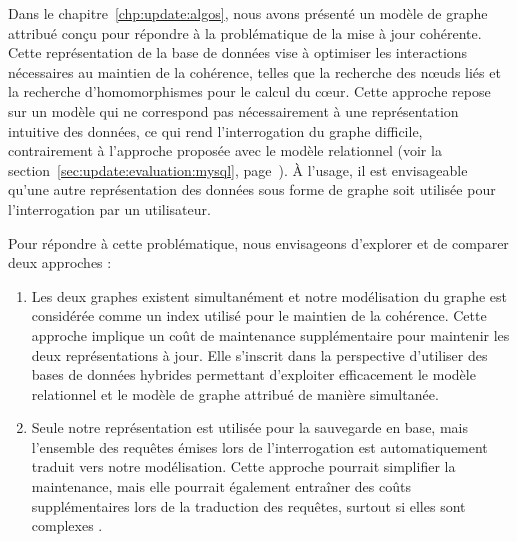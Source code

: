 Dans le chapitre~\ref{chp:update:algos}, nous avons présenté un modèle de graphe attribué conçu pour répondre à la problématique de la mise à jour cohérente.
Cette représentation de la base de données vise à optimiser les interactions nécessaires au maintien de la cohérence, telles que la recherche des nœuds liés et la recherche d'homomorphismes pour le calcul du cœur.
Cette approche repose sur un modèle qui ne correspond pas nécessairement à une représentation intuitive des données, ce qui rend l'interrogation du graphe difficile, contrairement à l'approche proposée avec le modèle relationnel (voir la section~\ref{sec:update:evaluation:mysql}, page~\pageref{sec:update:evaluation:mysql}).
À l'usage, il est envisageable qu'une autre représentation des données sous forme de graphe soit utilisée pour l'interrogation par un utilisateur.

Pour répondre à cette problématique, nous envisageons d'explorer et de comparer deux approches :
\begin{enumerate}
    \item Les deux graphes existent simultanément et notre modélisation du graphe est considérée comme un index utilisé pour le maintien de la cohérence.
    Cette approche implique un coût de maintenance supplémentaire pour maintenir les deux représentations à jour.
    Elle s'inscrit dans la perspective d'utiliser des bases de données hybrides \cite{hassanGRFusionGraphsFirstClass2018} permettant d'exploiter efficacement le modèle relationnel et le modèle de graphe attribué de manière simultanée.

    \item Seule notre représentation est utilisée pour la sauvegarde en base, mais l'ensemble des requêtes émises lors de l'interrogation est automatiquement traduit vers notre modélisation.
    Cette approche pourrait simplifier la maintenance, mais elle pourrait également entraîner des coûts supplémentaires lors de la traduction des requêtes, surtout si elles sont complexes \cite{sujanskyHeterogeneousDatabaseIntegration2001,asfand-e-yarSemanticIntegrationHeterogeneous2020}.
\end{enumerate}

